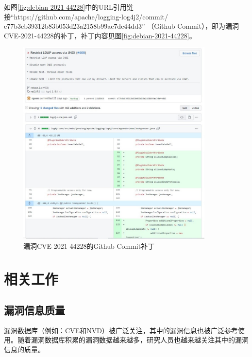 如图\ref{fig:debian-2021-44228}中的URL引用链接“https://github.com/apache/logging-log4j2/commit/\\c77b3cb39312b83b053d23a2158b99ac7de44dd3” （Github Commit），即为漏洞CVE-2021-44228的补丁，补丁内容见图\ref{fig:debian-2021-44228}。

\begin{figure}[h]
    \centering
    \includegraphics[width=0.88\textwidth]{res/commit-2021-44228}
    \caption{漏洞CVE-2021-44228的Github Commit补丁}
    \label{fig:commit-2021-44228}
\end{figure}



\section{相关工作}
\subsection{漏洞信息质量}
漏洞数据库（例如：CVE和NVD）被广泛关注，其中的漏洞信息也被广泛参考使用。随着漏洞数据库积累的漏洞数据越来越多，研究人员也越来越关注其中的漏洞信息的质量。

